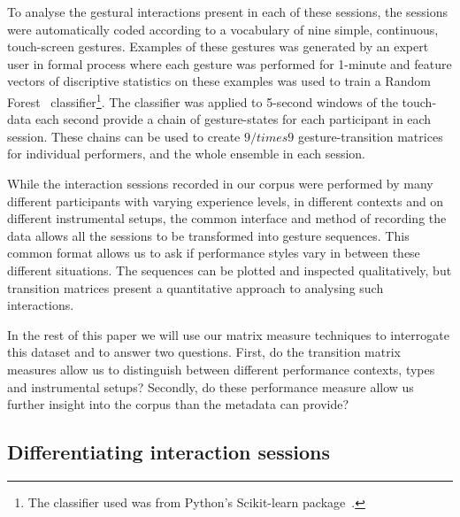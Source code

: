 \documentclass{sigchi}
\begin{document}
To analyse the gestural interactions present in each of these
sessions, the sessions were automatically coded according to a
vocabulary of nine simple, continuous, touch-screen gestures. Examples
of these gestures was generated by an expert user in formal process
where each gesture was performed for 1-minute and feature vectors of
discriptive statistics on these examples was used to train a Random
Forest~\cite{Breiman:2001kx} classifier\footnote{The classifier used
  was from Python's Scikit-learn package~\cite{scikit-learn}.}. The
classifier was applied to 5-second windows of the touch-data each
second provide a chain of gesture-states for each participant in each
session. These chains can be used to create $9 /times 9$
gesture-transition matrices for individual performers, and the whole
ensemble in each session.

While the interaction sessions recorded in our corpus were performed
by many different participants with varying experience levels, in
different contexts and on different instrumental setups, the common
interface and method of recording the data allows all the sessions to
be transformed into gesture sequences. This common format allows us to
ask if performance styles vary in between these different situations.
The sequences can be plotted and inspected qualitatively, but
transition matrices present a quantitative approach to analysing such
interactions.

In the rest of this paper we will use our matrix measure techniques to
interrogate this dataset and to answer two questions. First, do the
transition matrix measures allow us to distinguish between different
performance contexts, types and instrumental setups? Secondly, do
these performance measure allow us further insight into the corpus
than the metadata can provide?

\subsection{Differentiating interaction sessions}
\label{differentiating-interaction-sessions}
\end{document}

